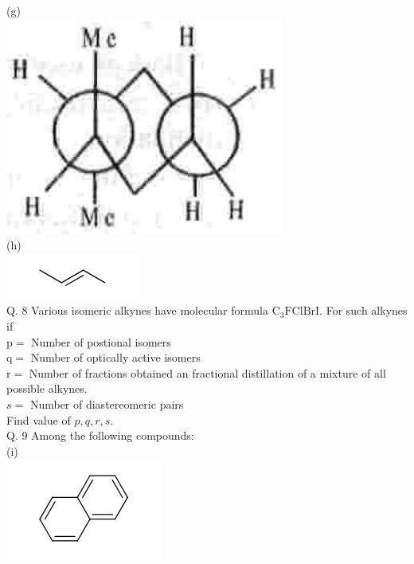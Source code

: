 \documentclass[10pt]{article}
\begin{document}
(g)\\
\includegraphics[max width=\textwidth, center]{2025_01_28_8470952b98110cec3aabg-152(1)}\\
(h)\\
\includegraphics{smile-6ab25a41a28d24cf5ea236eeda8c684aa9d35972}\\
Q. 8 Various isomeric alkynes have molecular formula $\mathrm{C}_{3} \mathrm{FClBrI}$. For such alkynes if\\
$\mathrm{p}=$ Number of postional isomers\\
$\mathrm{q}=$ Number of optically active isomers\\
$\mathrm{r}=$ Number of fractions obtained an fractional distillation of a mixture of all possible alkynes.\\
$s=$ Number of diastereomeric pairs\\
Find value of $p, q, r, s$.\\
Q. 9 Among the following compounds:\\
(i)\\
\includegraphics{smile-58fcbe18c832ac96b4eb48a719a65795a50b350d}\\
\end{document}

